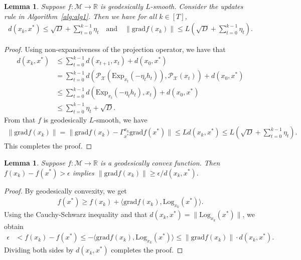 \documentclass{article}
\newcommand{\rgrad}{\mathrm{grad}}
\newcommand{\Log}{\mathrm{Log}}
\theoremstyle{plain}
\newtheorem{lemma}[theorem]{Lemma}
\theoremstyle{definition}
\theoremstyle{remark}
\begin{document}
\begin{lemma}\label{lem:xt_gt_upper_bound}
Suppose $f : \mathcal{M} \rightarrow \mathbb{R}$ is geodesically ${L}$-smooth. Consider the updates rule in Algorithm~\ref{alg:alg1}. Then we have for all $k \in [T]$,
\begin{align*}
d(x_{k}, x^*) \leq \sqrt{D} + \sum_{t=0}^{k-1}\eta_t 
\quad \text{and} \quad
\| \rgrad f(x_{k}) \| \leq {L} \left(\sqrt{D} + \sum_{t=0}^{k-1}\eta_t\right).
\end{align*}
\end{lemma}

\begin{proof}
Using non-expansiveness of the projection operator, we have that
\begin{align*}
d(x_{k} , x^* )
&\leq \sum_{t=0}^{k-1} d(x_{t+1} ,x_t ) + d( x_0 , x^* )\\
&= \sum_{t=0}^{k-1} d(\mathcal{P}_\mathcal{X}(\mathrm{Exp}_{x_t}(-\eta_t h_t)) ,\mathcal{P}_\mathcal{X}(x_t) ) + d( x_0 , x^* )\\
&\leq \sum_{t=0}^{k-1} d(\mathrm{Exp}_{x_t}(-\eta_t h_t) ,x_t ) + d( x_0 , x^* )\\
&\leq \sum_{t=0}^{k-1}\eta_t + \sqrt{D}.
\end{align*}
From that $f$ is geodesically ${L}$-smooth, we have
\begin{align*}
\| \rgrad f(x_{k})\|=
\| \rgrad f(x_{k}) - \Gamma_{x^*}^{x_{k}}\rgrad f(x^*) \|
\leq {L} d( x_{k} , x^* )
\leq {L} \left(\sqrt{D}+\sum_{t=0}^{k-1}\eta_t\right).
\end{align*}
This completes the proof. 
\end{proof}

\begin{lemma}\label{lem:gt_lower_bound}
Suppose $f : \mathcal{M} \rightarrow \mathbb{R}$ is a geodesically convex function. Then $f(x_k)-f(x^*)>\epsilon$ implies $\|\rgrad f(x_k)\|\geq {\epsilon}/{d(x_k,x^*)}.$
\end{lemma}

\begin{proof}
By geodesically convexity, we get 
\begin{align*}
    f(x^*)\geq f(x_k)+\langle \rgrad f(x_k), \Log_{x_k}(x^*)\rangle.
\end{align*}
Using the Cauchy-Schwarz inequality and that $d(x_k, x^*) = \|\Log_{x_k}(x^*)\|$, we obtain
\begin{align*}
    \epsilon&<f(x_k)-f(x^*)\leq - \langle \rgrad f(x_k), \Log_{x_k}(x^*)\rangle \leq\|\rgrad f(x_k)\|\cdot d(x_k,x^*).
\end{align*}
Dividing both sides by $d(x_k, x^*)$ completes the proof.
\end{proof}
\end{document}
